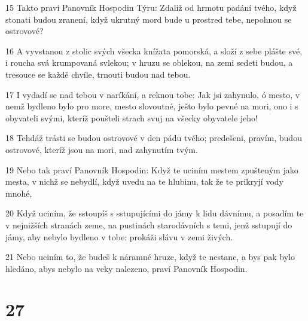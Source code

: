 \par 15 Takto praví Panovník Hospodin Týru: Zdaliž od hrmotu padání tvého, když stonati budou zranení, když ukrutný mord bude u prostred tebe, nepohnou se ostrovové?
\par 16 A vyvstanou z stolic svých všecka knížata pomorská, a složí z sebe plášte své, i roucha svá krumpovaná svlekou; v hruzu se oblekou, na zemi sedeti budou, a tresouce se každé chvíle, trnouti budou nad tebou.
\par 17 I vydadí se nad tebou v naríkání, a reknou tobe: Jak jsi zahynulo, ó mesto, v nemž bydleno bylo pro more, mesto slovoutné, ješto bylo pevné na mori, ono i s obyvateli svými, kteríž poušteli strach svuj na všecky obyvatele jeho!
\par 18 Tehdáž trásti se budou ostrovové v den pádu tvého; predešeni, pravím, budou ostrovové, kteríž jsou na mori, nad zahynutím tvým.
\par 19 Nebo tak praví Panovník Hospodin: Když te uciním mestem zpušteným jako mesta, v nichž se nebydlí, když uvedu na te hlubinu, tak že te prikryjí vody mnohé,
\par 20 Když uciním, že sstoupíš s sstupujícími do jámy k lidu dávnímu, a posadím te v nejnižších stranách zeme, na pustinách starodávních s temi, jenž sstupují do jámy, aby nebylo bydleno v tobe: prokáži slávu v zemi živých.
\par 21 Nebo uciním to, že budeš k náramné hruze, když te nestane, a bys pak bylo hledáno, abys nebylo na veky nalezeno, praví Panovník Hospodin.

\chapter{27}

